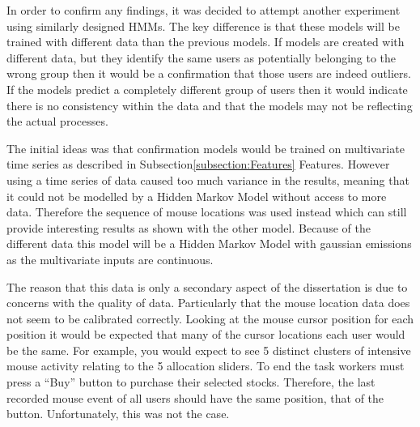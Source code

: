 \documentclass{article}
\begin{document}

In order to confirm any findings, it was decided to attempt another experiment using similarly designed HMMs.
The key difference is that these models will be trained with different data than the previous models.
If models are created with different data, but they identify the same users as potentially belonging to the wrong group then it would be a confirmation that those users are indeed outliers.
If the models predict a completely different group of users then it would indicate there is no consistency within the data and that the models may not be reflecting the actual processes.  


The initial ideas was that confirmation models would be trained on multivariate time series as described in Subsection\ref{subsection:Features} Features.
However using a time series of data caused too much variance in the results, meaning that it could not be modelled by a Hidden Markov Model without access to more data.
Therefore the sequence of mouse locations was used instead which can still provide interesting results as shown with the other model.
Because of the different data this model will be a Hidden Markov Model with gaussian emissions as the multivariate inputs are continuous.

The reason that this data is only a secondary aspect of the dissertation is due to concerns with the quality of data.
Particularly that the mouse location data does not seem to be calibrated correctly.
Looking at the mouse cursor position for each position it would be expected that many of the cursor locations each user would be the same.
For example, you would expect to see 5 distinct clusters of intensive mouse activity relating to the 5 allocation sliders.
To end the task workers must press a ``Buy'' button to purchase their selected stocks.
Therefore, the last recorded mouse event of all users should have the same position, that of the button.
Unfortunately, this was not the case.
\end{document}
